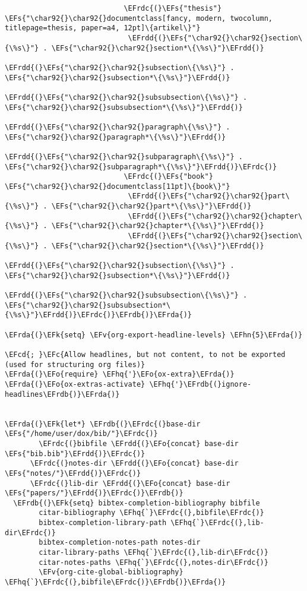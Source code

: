 \documentclass[a4wide,10pt]{article}
\newcommand{\EFc}[1]{\textcolor{EFc}{#1}} %
\newcommand{\EFcd}[1]{\textcolor{EFcd}{#1}} %
\newcommand{\EFs}[1]{\textcolor{EFs}{#1}} %
\newcommand{\EFk}[1]{\textcolor{EFk}{#1}} %
\newcommand{\EFv}[1]{\textcolor{EFv}{#1}} %
\newcommand{\EFo}[1]{\textcolor{EFo}{#1}} %
\newcommand{\EFhn}[1]{\textcolor{EFhn}{\textbf{#1}}} %
\newcommand{\EFhq}[1]{\textcolor{EFhq}{#1}} %
\newcommand{\EFrda}[1]{\textcolor{EFrda}{#1}} %
\newcommand{\EFrdb}[1]{\textcolor{EFrdb}{#1}} %
\newcommand{\EFrdc}[1]{\textcolor{EFrdc}{#1}} %
\newcommand{\EFrdd}[1]{\textcolor{EFrdd}{#1}} %
\begin{document}
\begin{Code}
\begin{Verbatim}
                            \EFrdc{(}\EFs{"thesis"} \EFs{"\char92{}\char92{}documentclass[fancy, modern, twocolumn, titlepage=thesis, paper=a4, 12pt]\{artikel\}"}
                             \EFrdd{(}\EFs{"\char92{}\char92{}section\{\%s\}"} . \EFs{"\char92{}\char92{}section*\{\%s\}"}\EFrdd{)}
                             \EFrdd{(}\EFs{"\char92{}\char92{}subsection\{\%s\}"} . \EFs{"\char92{}\char92{}subsection*\{\%s\}"}\EFrdd{)}
                             \EFrdd{(}\EFs{"\char92{}\char92{}subsubsection\{\%s\}"} . \EFs{"\char92{}\char92{}subsubsection*\{\%s\}"}\EFrdd{)}
                             \EFrdd{(}\EFs{"\char92{}\char92{}paragraph\{\%s\}"} . \EFs{"\char92{}\char92{}paragraph*\{\%s\}"}\EFrdd{)}
                             \EFrdd{(}\EFs{"\char92{}\char92{}subparagraph\{\%s\}"} . \EFs{"\char92{}\char92{}subparagraph*\{\%s\}"}\EFrdd{)}\EFrdc{)}
                            \EFrdc{(}\EFs{"book"} \EFs{"\char92{}\char92{}documentclass[11pt]\{book\}"}
                             \EFrdd{(}\EFs{"\char92{}\char92{}part\{\%s\}"} . \EFs{"\char92{}\char92{}part*\{\%s\}"}\EFrdd{)}
                             \EFrdd{(}\EFs{"\char92{}\char92{}chapter\{\%s\}"} . \EFs{"\char92{}\char92{}chapter*\{\%s\}"}\EFrdd{)}
                             \EFrdd{(}\EFs{"\char92{}\char92{}section\{\%s\}"} . \EFs{"\char92{}\char92{}section*\{\%s\}"}\EFrdd{)}
                             \EFrdd{(}\EFs{"\char92{}\char92{}subsection\{\%s\}"} . \EFs{"\char92{}\char92{}subsection*\{\%s\}"}\EFrdd{)}
                             \EFrdd{(}\EFs{"\char92{}\char92{}subsubsection\{\%s\}"} . \EFs{"\char92{}\char92{}subsubsection*\{\%s\}"}\EFrdd{)}\EFrdc{)}\EFrdb{)}\EFrda{)}

\EFrda{(}\EFk{setq} \EFv{org-export-headline-levels} \EFhn{5}\EFrda{)}

\EFcd{; }\EFc{Allow headlines, but not content, to not be exported (used for structuring org files)}
\EFrda{(}\EFo{require} \EFhq{'}\EFo{ox-extra}\EFrda{)}
\EFrda{(}\EFo{ox-extras-activate} \EFhq{'}\EFrdb{(}ignore-headlines\EFrdb{)}\EFrda{)}


\EFrda{(}\EFk{let*} \EFrdb{(}\EFrdc{(}base-dir \EFs{"/home/user/dox/bib/"}\EFrdc{)}
        \EFrdc{(}bibfile \EFrdd{(}\EFo{concat} base-dir \EFs{"bib.bib"}\EFrdd{)}\EFrdc{)}
      \EFrdc{(}notes-dir \EFrdd{(}\EFo{concat} base-dir \EFs{"notes/"}\EFrdd{)}\EFrdc{)}
      \EFrdc{(}lib-dir \EFrdd{(}\EFo{concat} base-dir \EFs{"papers/"}\EFrdd{)}\EFrdc{)}\EFrdb{)}
  \EFrdb{(}\EFk{setq} bibtex-completion-bibliography bibfile
        citar-bibliography \EFhq{`}\EFrdc{(},bibfile\EFrdc{)}
        bibtex-completion-library-path \EFhq{`}\EFrdc{(},lib-dir\EFrdc{)}
        bibtex-completion-notes-path notes-dir
        citar-library-paths \EFhq{`}\EFrdc{(},lib-dir\EFrdc{)}
        citar-notes-paths \EFhq{`}\EFrdc{(},notes-dir\EFrdc{)}
        \EFv{org-cite-global-bibliography} \EFhq{`}\EFrdc{(},bibfile\EFrdc{)}\EFrdb{)}\EFrda{)}


\end{Verbatim}
\end{Code}
\end{document}
